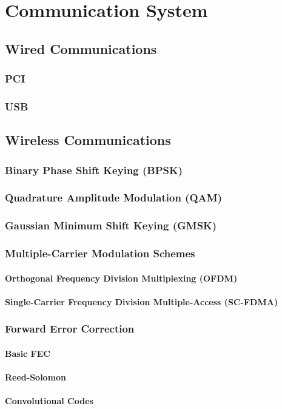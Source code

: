 \chapter{Communication System}

\section{Wired Communications}
\subsection{PCI}
\subsection{USB}

\section{Wireless Communications}
\subsection{Binary Phase Shift Keying (BPSK)}
\subsection{Quadrature Amplitude Modulation (QAM)}
\subsection{Gaussian Minimum Shift Keying (GMSK)}

\subsection{Multiple-Carrier Modulation Schemes}
\subsubsection{Orthogonal Frequency Division Multiplexing (OFDM)}
\subsubsection{Single-Carrier Frequency Division Multiple-Access (SC-FDMA)}

\subsection{Forward Error Correction}
\subsubsection{Basic FEC}
\subsubsection{Reed-Solomon}
\subsubsection{Convolutional Codes}
